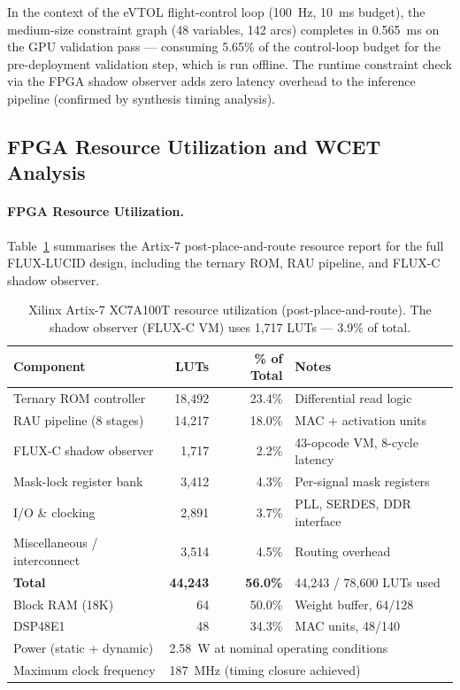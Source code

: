 \documentclass[conference]{IEEEtran}
\begin{document}
In the context of the eVTOL flight-control loop (100~Hz, 10~ms budget),
the medium-size constraint graph (48 variables, 142 arcs) completes in
0.565~ms on the GPU validation pass — consuming 5.65\% of the control-loop
budget for the pre-deployment validation step, which is run offline.
The runtime constraint check via the FPGA shadow observer adds zero latency
overhead to the inference pipeline (confirmed by synthesis timing analysis).

\subsection{FPGA Resource Utilization and WCET Analysis}
\label{sec:eval-fpga}

\paragraph{FPGA Resource Utilization.}
Table~\ref{tab:fpga} summarises the Artix-7 post-place-and-route resource
report for the full FLUX-LUCID design, including the ternary ROM, RAU
pipeline, and FLUX-C shadow observer.

\begin{table}[t]
\centering
\caption{Xilinx Artix-7 XC7A100T resource utilization (post-place-and-route).
The shadow observer (FLUX-C VM) uses 1,717 LUTs — 3.9\% of total.}
\label{tab:fpga}
\renewcommand{\arraystretch}{1.15}
\begin{tabular}{lrrl}
\toprule
\textbf{Component} & \textbf{LUTs} & \textbf{\% of Total} & \textbf{Notes} \\
\midrule
Ternary ROM controller          & 18,492 & 23.4\% & Differential read logic \\
RAU pipeline (8 stages)         & 14,217 & 18.0\% & MAC + activation units \\
FLUX-C shadow observer          & 1,717  & 2.2\%  & 43-opcode VM, 8-cycle latency \\
Mask-lock register bank         & 3,412  & 4.3\%  & Per-signal mask registers \\
I/O \& clocking                 & 2,891  & 3.7\%  & PLL, SERDES, DDR interface \\
Miscellaneous / interconnect    & 3,514  & 4.5\%  & Routing overhead \\
\midrule
\textbf{Total}                  & \textbf{44,243} & \textbf{56.0\%} & 44,243 / 78,600 LUTs used \\
\midrule
Block RAM (18K)                 & 64     & 50.0\% & Weight buffer, 64/128 \\
DSP48E1                         & 48     & 34.3\% & MAC units, 48/140 \\
Power (static + dynamic)        & \multicolumn{3}{l}{2.58~W at nominal operating conditions} \\
Maximum clock frequency         & \multicolumn{3}{l}{187~MHz (timing closure achieved)} \\
\bottomrule
\end{tabular}
\end{table}
\end{document}

